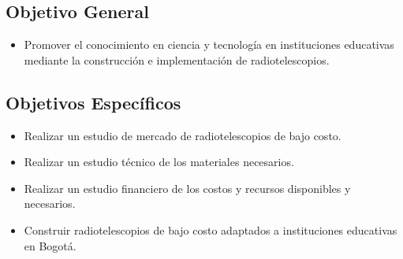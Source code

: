 \subsection{Objetivo General}
\begin{itemize}
  \item Promover el conocimiento en ciencia y tecnología en instituciones
    educativas mediante la construcción e implementación de radiotelescopios.
\end{itemize}

\subsection{Objetivos Específicos}
\begin{itemize}
  \item Realizar un estudio de mercado de radiotelescopios de bajo costo.
  \item Realizar un estudio técnico de los materiales necesarios.
  \item Realizar un estudio financiero de los costos y recursos disponibles y
    necesarios.
  \item Construir radiotelescopios de bajo costo adaptados a instituciones
    educativas en Bogotá.
\end{itemize}
